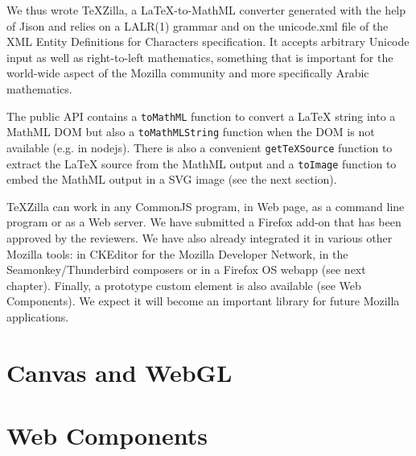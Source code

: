 We thus wrote TeXZilla, a LaTeX-to-MathML converter generated with the help of
Jison and relies on a LALR(1) grammar and on the unicode.xml file of
the XML Entity Definitions for Characters specification. It accepts arbitrary
Unicode input as well as right-to-left mathematics, something that is important
for the world-wide aspect of the Mozilla community and more specifically
Arabic mathematics.

The public API contains a {\tt toMathML} function to convert a LaTeX string
into a MathML DOM but also a {\tt toMathMLString} function when the DOM is
not available (e.g. in nodejs). There is also a convenient {\tt getTeXSource}
function to extract the LaTeX source from the MathML output and a
{\tt toImage} function to embed the MathML output in a SVG image (see the next
section).

TeXZilla can work in any CommonJS program, in Web page, as a command line
program or as a Web server. We have submitted a Firefox add-on
that has been approved by the reviewers. We have also already integrated it in
various other Mozilla tools: in CKEditor for the Mozilla Developer Network,
in the Seamonkey/Thunderbird composers or in a Firefox OS webapp (see next
chapter). Finally, a prototype {\tt <x-tex>} custom element is also available
(see Web Components). We expect it will become an important library for future
Mozilla applications.

\section{Canvas and WebGL}


\section{Web Components}

